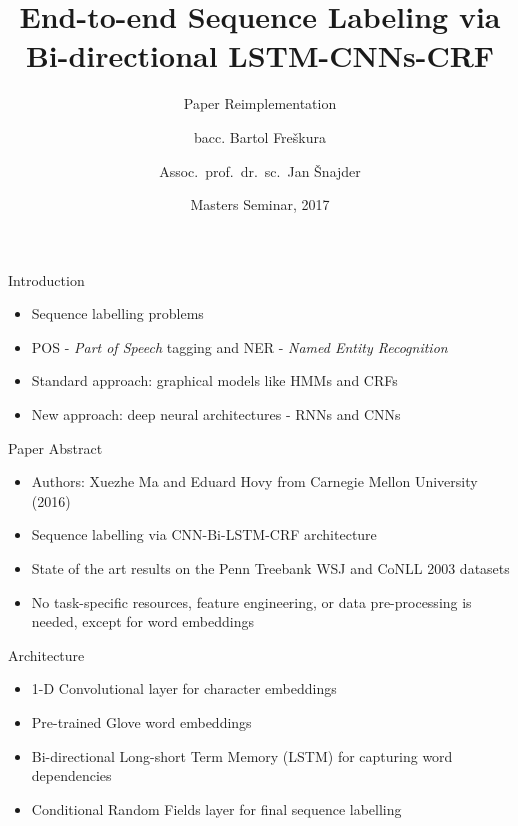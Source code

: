 \documentclass{beamer}
\title{End-to-end Sequence Labeling via Bi-directional
LSTM-CNNs-CRF}
\subtitle{Paper Reimplementation}
\author{bacc. Bartol Freškura\inst{1} \and Assoc.~prof.~dr.~sc.~Jan Šnajder\inst{2}}
\institute[Faculty of Electrical Engineering and Computing] %
{
  \inst{1}%
  Author\\
  Faculty of Electrical Engineering and Computing
  \and
  \inst{2}%
  Mentor\\
  Faculty of Electrical Engineering and Computing
}
\date{Masters Seminar, 2017}
\begin{document}
\begin{frame}
  \titlepage
\end{frame}


\begin{frame}{Introduction}
  \begin{itemize}
  \item {
    Sequence labelling problems
  }
  \item {
      POS - \textit{Part of Speech} tagging and NER - \textit{Named Entity Recognition}
  }
  \item {
    Standard approach: graphical models like HMMs and CRFs
  }
  \item{
   New approach: deep neural architectures - RNNs and CNNs
  }
  \end{itemize}
\end{frame}


\begin{frame}{Paper Abstract}
    \begin{itemize}
    \item{
            Authors: Xuezhe Ma and Eduard Hovy from Carnegie Mellon University
            (2016)
        }
        \item{
            Sequence labelling via CNN-Bi-LSTM-CRF architecture
            }
        \item{
            State of the art results on the Penn Treebank WSJ and CoNLL 2003 datasets
            }
        \item{
            No task-specific resources, feature engineering, or data pre-processing is
            needed, except for word embeddings
        }
  \end{itemize}
\end{frame}


\begin{frame}{Architecture}
    \begin{itemize}
        \item{
            1-D Convolutional layer for character embeddings
            }
        \item{
            Pre-trained Glove word embeddings
            }
        \item{
            Bi-directional Long-short Term Memory (LSTM) for capturing word
            dependencies
            }
        \item{
            Conditional Random Fields layer for final sequence labelling
        }
  \end{itemize}
\end{frame}
\end{document}
